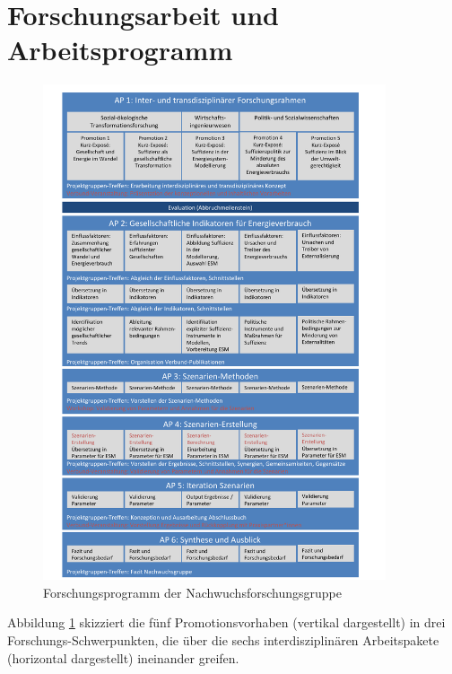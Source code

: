 \documentclass[a4paper,11pt,twoside]{scrartcl}
\begin{document}
\section{Forschungsarbeit und Arbeitsprogramm}
\label{sec:4}

\begin{figure}[!h]
    \centering
    \includegraphics[width=0.9\textwidth]{figures/Forschungsarbeit3.pdf}
    \caption{Forschungsprogramm der Nachwuchsforschungsgruppe}
    \label{fig:forschungsprogramm}
\end{figure}

Abbildung \ref{fig:forschungsprogramm} skizziert die fünf Promotionsvorhaben (vertikal dargestellt) in drei Forschungs-Schwerpunkten, die über die sechs interdisziplinären Arbeitspakete (horizontal dargestellt) ineinander greifen.
\end{document}
